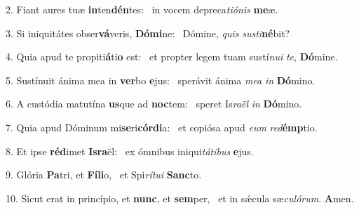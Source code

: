 2. Fiant aures tuæ \textbf{in}ten\textbf{dén}tes: \ast\  in vocem depreca\textit{ti}\textit{ó}\textit{nis} \textbf{me}æ.\

3. Si iniquitátes obser\textbf{vá}veris, \textbf{Dó}\textbf{mi}ne: \ast\  Dómine, \textit{quis} \textit{sus}\textit{ti}\textbf{né}bit?\

4. Quia apud te propiti\textbf{á}ti\textbf{o} est: \ast\  et propter legem tuam sustí\textit{nu}\textit{i} \textit{te}, \textbf{Dó}mine.\

5. Sustínuit ánima mea in \textbf{ver}bo \textbf{e}jus: \ast\  sperávit ánima \textit{me}\textit{a} \textit{in} \textbf{Dó}mino.\

6. A custódia matutína \textbf{us}que ad \textbf{noc}tem: \ast\  speret Is\textit{ra}\textit{ël} \textit{in} \textbf{Dó}mino.\

7. Quia apud Dóminum mi\textbf{se}ri\textbf{cór}\textbf{di}a: \ast\  et copiósa apud \textit{e}\textit{um} \textit{red}\textbf{émp}tio.\

8. Et ipse \textbf{réd}imet \textbf{Is}\textbf{ra}ël: \ast\  ex ómnibus iniqui\textit{tá}\textit{ti}\textit{bus} \textbf{e}jus.\

9. Glória \textbf{Pa}tri, et \textbf{Fí}\textbf{li}o, \ast\  et Spi\textit{rí}\textit{tu}\textit{i} \textbf{Sanc}to.\

10. Sicut erat in princípio, et \textbf{nunc}, et \textbf{sem}per, \ast\  et in sǽcula sæ\textit{cu}\textit{ló}\textit{rum}. \textbf{A}men.\

